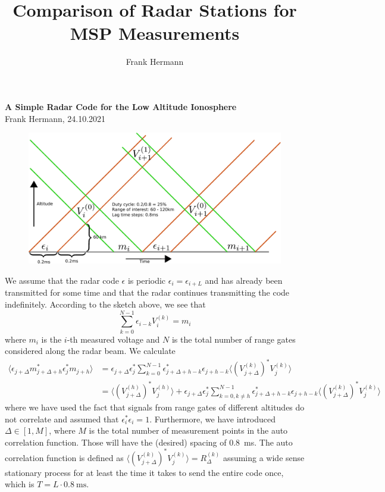 \documentclass[18pt,a4paper]{extarticle}
\author{Frank Hermann}
\title{Comparison of Radar Stations for MSP Measurements}
\begin{document}
\begin{center}
	\textbf{\Large{A Simple Radar Code for the Low Altitude Ionosphere}}\\
	\small{Frank Hermann, 24.10.2021}
\end{center}
\begin{figure}[h!]
	\centering
	\includegraphics[width=0.9\linewidth]{code_diagram.pdf}
\end{figure}
We assume that the radar code $\epsilon$ is periodic $\epsilon_i = \epsilon_{i + L}$ and has already been transmitted for some time and that the radar continues transmitting the code indefinitely.
According to the sketch above, we see that
$$
\sum_{k=0}^{N-1} \epsilon_{i-k} V^{(k)}_i = m_i
$$
where $m_i$ is the $i$-th measured voltage and $N$ is the total number of range gates considered along the radar beam.
We calculate
\begin{align*}
\langle \epsilon_{j + \Delta}m_{j + \Delta + h}^* \epsilon_j^*m_{j+h}\rangle &= \epsilon_{j + \Delta}\epsilon_j^* \sum_{k=0}^{N-1} \epsilon_{j+\Delta+h-k}^*\epsilon_{j+h-k} \langle (V^{(k)}_{j + \Delta})^*V^{(k)}_j \rangle\\
&= \langle (V_{j+\Delta}^{(h)})^* V_j^{(h)} \rangle + \epsilon_{j + \Delta}\epsilon_j^*\sum_{k=0,k\neq h}^{N-1} \epsilon_{j+\Delta+h-k}^*\epsilon_{j+h-k} \langle (V^{(k)}_{j + \Delta})^*V^{(k)}_j \rangle
\end{align*}
where we have used the fact that signals from range gates of different altitudes do not correlate and assumed that $\epsilon_i^*\epsilon_i = 1$.
Furthermore, we have introduced $\Delta \in [1, M]$, where $M$ is the total number of measurement points in the auto correlation function.
Those will have the (desired) spacing of \SI{0.8}{\ms}.
The auto correlation function is defined as $\langle (V_{j+\Delta}^{(k)})^* V_j^{(k)} \rangle = R^{(k)}_\Delta$ assuming a wide sense stationary process for at least the time it takes to send the entire code once, which is $T = L\cdot\SI{0.8}{\ms}$.
\end{document}
